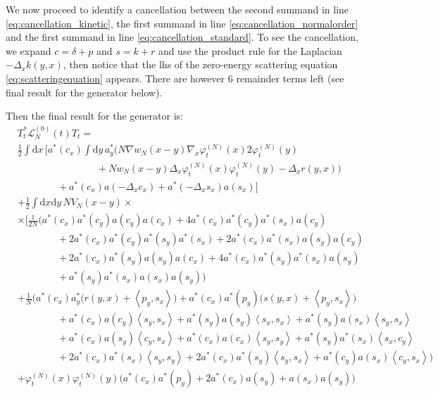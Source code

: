 \documentclass[11pt,a4paper,twoside,headsepline]{scrartcl}
\newcommand{\di}{\textrm{d}}		%
\newcommand{\Lcal}{\mathcal{L}}		%
\newcommand{\scal}[2]{\left<#1,#2\right>} %
\newcommand{\ph}{\varphi_t^{(N)}}	%
\newcommand{\eqr}[1]{\eqref{eq:#1}}			%
\begin{document}
We now proceed to identify a cancellation between the second summand in line \eqr{cancellation_kinetic}, the first summand in line \eqr{cancellation_normalorder} and the first summand in line \eqr{cancellation_standard}. To see the cancellation, we expand $c = \delta + p$ and $s = k + r$ and use the product rule for the Laplacian $-\Delta_x k(y,x)$, then notice that the lhs of the zero-energy scattering equation \eqr{scatteringequation} appears. There are however 6 remainder terms left (see final result for the generator below).

Then the final result for the generator is:
\begin{align}
& T^*_t \Lcal_N^{(0)}(t) T_t = \nonumber \\ 
& \frac{1}{2} \int \di x\, \bigg[ a^*(c_x) \int \di y\, a^*_y \Big( N \nabla w_N(x-y) \nabla_x \ph(x) 2 \ph(y) \\
& \qquad\qquad \qquad\qquad						+ Nw_N(x-y) \Delta_x \ph(x) \ph(y) - \Delta_x r(y,x) \Big) \\
& \qquad\qquad 			+ a^*(c_x) a(-\Delta_x c_x) + a^*(-\Delta_x s_x) a(s_x) \bigg] \\
& + \frac{1}{2}\int \di x \di y\, NV_N(x-y) \times \nonumber \\
& \times \Big[   \frac{1}{2N}\bigg( a^*(c_x) a^*(c_y) a(c_y) a(c_x) + 4 a^*(c_x) a^*(c_y) a^*(s_x) a(c_y) \\
				      & \qquad\qquad + 2 a^*(c_x) a^*(c_y) a^*(s_y) a^*(s_x) + 2 a^*(c_x) a^*(s_x) a(s_y) a(c_y) \\
				      & \qquad\qquad + 2 a^*(c_x) a^*(s_y) a(s_y) a(c_x) + 4 a^*(c_x) a^*(s_y) a^*(s_x) a(s_y) \\
				      & \qquad\qquad + a^*(s_y) a^*(s_x) a(s_x) a(s_y) \bigg) \\
& + \frac{1}{N}\bigg(   a^*(c_x) a^*_y \Big( r(y,x) + \scal{p_y}{s_x} \Big) + a^*(c_x) a^*(p_y) \Big( s(y,x) + \scal{p_y}{s_x} \Big) \\
      & \qquad\qquad + a^*(c_x) a(c_y) \scal{s_y}{s_x} + a^*(s_y) a(s_y) \scal{s_x}{s_x} + a^*(s_y) a(s_x) \scal{s_y}{s_x}\\
      & \qquad\qquad + a^*(c_x) a(s_y) \scal{c_y}{s_x} + a^*(c_x) a(c_x) \scal{s_y}{s_y} + a^*(s_y) a^*(s_x) \scal{s_x}{c_y}\\
      & \qquad\qquad + 2a^*(c_x) a^*(s_x) \scal{s_y}{s_y} + 2a^*(c_x)a^*(s_y) \scal{s_y}{s_x} + a^*(c_y) a(s_x) \scal{c_y}{s_x}    \bigg) \\
& + \ph(x)\ph(y) \Big( a^*(c_x) a^*(p_y) + 2 a^*(c_x) a(s_y) +a(s_x) a(s_y) \Big) \\

\end{align}
\end{document}
